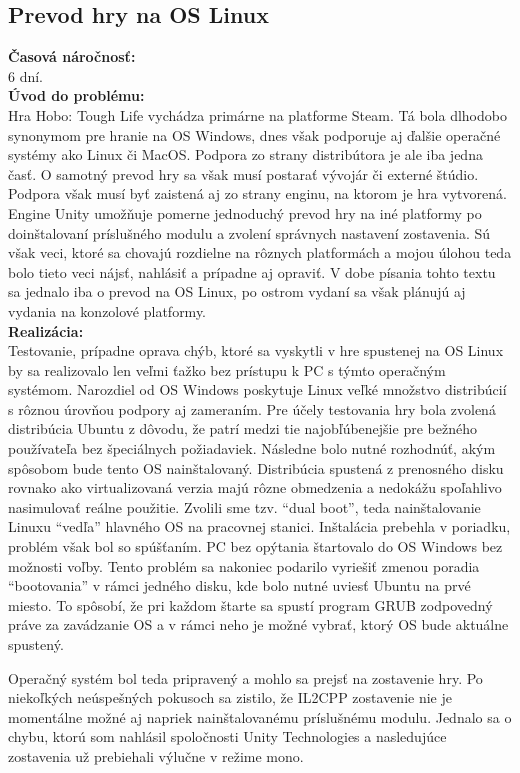 \documentclass[slovak, bachelorpractice]{diploma}
\begin{document}
\subsection{Prevod hry na OS Linux}
\label{sec:linux}
\textbf{Časová náročnosť:} \\ 6 dní.\\
\textbf{Úvod do problému:} \\ Hra Hobo: Tough Life vychádza primárne na platforme Steam. Tá bola dlhodobo synonymom pre hranie na OS Windows, dnes však podporuje aj ďalšie operačné systémy ako Linux či MacOS. Podpora zo strany distribútora je ale iba jedna časť. O samotný prevod hry sa však musí  postarať vývojár či externé štúdio. Podpora však musí byť zaistená aj zo strany enginu, na ktorom je hra vytvorená. Engine Unity umožňuje pomerne jednoduchý prevod hry na iné platformy po doinštalovaní príslušného modulu a zvolení správnych nastavení zostavenia. Sú však veci, ktoré sa chovajú rozdielne na rôznych platformách a mojou úlohou teda bolo tieto veci nájsť, nahlásiť a prípadne aj opraviť. V dobe písania tohto textu sa jednalo iba o prevod na OS Linux, po ostrom vydaní sa však plánujú aj vydania na konzolové platformy.\\
\textbf{Realizácia:} \\ Testovanie, prípadne oprava chýb, ktoré sa vyskytli v hre spustenej na OS Linux by sa realizovalo len veľmi ťažko bez prístupu k PC s týmto operačným systémom. Narozdiel od OS Windows poskytuje Linux veľké množstvo distribúcií s rôznou úrovňou podpory aj zameraním. Pre účely testovania hry bola zvolená distribúcia Ubuntu z dôvodu, že patrí medzi tie najobľúbenejšie pre bežného používateľa bez špeciálnych požiadaviek. Následne bolo nutné rozhodnúť, akým spôsobom bude tento OS nainštalovaný. Distribúcia spustená z prenosného disku rovnako ako virtualizovaná verzia majú rôzne obmedzenia a nedokážu spoľahlivo nasimulovať reálne použitie. Zvolili sme tzv. \enquote{dual boot}, teda nainštalovanie Linuxu \enquote{vedľa} hlavného OS na pracovnej stanici. Inštalácia prebehla v poriadku, problém však bol so spúšťaním. PC bez opýtania štartovalo do OS Windows bez možnosti voľby. Tento problém sa nakoniec podarilo vyriešiť zmenou poradia \enquote{bootovania} v rámci jedného disku, kde bolo nutné uviesť Ubuntu na prvé miesto. To spôsobí, že pri každom štarte sa spustí program GRUB zodpovedný práve za zavádzanie OS a v rámci neho je možné vybrať, ktorý OS bude aktuálne spustený.

Operačný systém bol teda pripravený a mohlo sa prejsť na zostavenie hry. Po niekoľkých neúspešných pokusoch sa zistilo, že IL2CPP zostavenie nie je momentálne možné aj napriek nainštalovanému príslušnému modulu. Jednalo sa o chybu, ktorú som nahlásil spoločnosti Unity Technologies a nasledujúce zostavenia už prebiehali výlučne v režime mono. 
\end{document}
